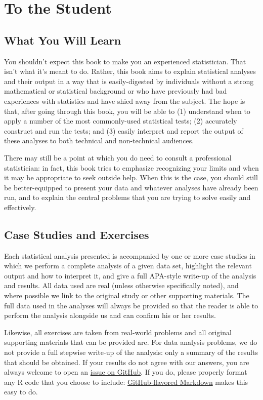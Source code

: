 \section{To the Student}
\subsection{What You Will Learn}
You shouldn't expect this book to make you an experienced statistician. That isn't what it's meant to do. Rather, this book aims to explain statistical analyses and their output in a way that is easily-digested by individuals without a strong mathematical or statistical background or who have previously had bad experiences with statistics and have shied away from the subject. The hope is that, after going through this book, you will be able to (1) understand when to apply a number of the most commonly-used statistical tests; (2) accurately construct and run the tests; and (3) easily interpret and report the output of these analyses to both technical and non-technical audiences.

There may still be a point at which you do need to consult a professional statistician: in fact, this book tries to emphasize recognizing your limits and when it may be appropriate to seek outside help. When this is the case, you should still be better-equipped to present your data and whatever analyses have already been run, and to explain the central problems that you are trying to solve easily and effectively.

\subsection{Case Studies and Exercises}
Each statistical analysis presented is accompanied by one or more case studies in which we perform a complete analysis of a given data set, highlight the relevant output and how to interpret it, and give a full APA-style write-up of the analysis and results. All data used are real (unless otherwise specifically noted), and where possible we link to the original study or other supporting materials. The full data used in the analyses will always be provided so that the reader is able to perform the analysis alongside us and can confirm his or her results.

Likewise, all exercises are taken from real-world problems and all original supporting materials that can be provided are. For data analysis problems, we do not provide a full stepwise write-up of the analysis: only a summary of the results that should be obtained. If your results do not agree with our answers, you are always welcome to open an \href{https://github.com/faulconbridge/appliedStats/issues}{issue on GitHub}. If you do, please properly format any R code that you choose to include: \href{https://guides.github.com/features/mastering-markdown/}{GitHub-flavored Markdown} makes this easy to do.

